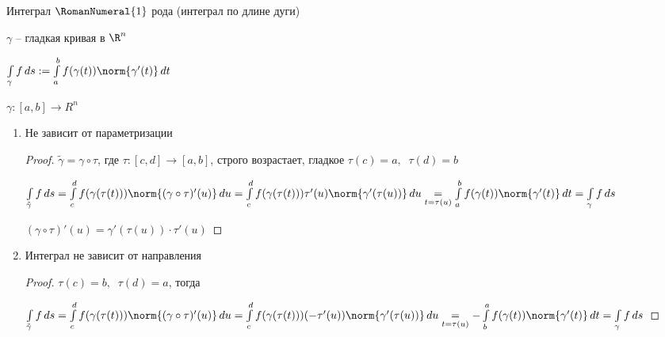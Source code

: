 
\begin{definition}\thmslashn
	
	Интеграл $\RomanNumeral{1}$ рода (интеграл по длине дуги)
	
	$\gamma$ -- гладкая кривая в $\R^n$
	
	$\int\limits_{\gamma} f \,ds := \int\limits_{a}^{b} f(\gamma(t)) \norm{\gamma'(t)} \,dt$
	
	$\gamma: [a, b] \to R^{n}$
	
\end{definition}

\begin{properties}\thmslashn
	
	\begin{enumerate}[1.]
		\item 
		Не зависит от параметризации
		
		\begin{proof}\thmslashn
			
			$\tilde{\gamma} = \gamma \circ \tau$, где $\tau: [c, d] \to [a, b]$, строго возрастает, гладкое $\tau(c) = a, \;\;\tau(d) = b$
			
			$\int\limits_{\tilde{\gamma}} f \,ds = \int\limits_{c}^{d} f(\gamma(\tau(t))) \norm{(\gamma\circ\tau)'(u)} \,du = \int\limits_{c}^{d} f(\gamma(\tau(t))) \tau'(u) \norm{\gamma'(\tau(u))} \,du \underset{t = \tau(u)}= \int\limits_{a}^{b} f(\gamma(t)) \norm{\gamma'(t)} \,dt = \int\limits_{\gamma} f \,ds$
			
			$(\gamma\circ \tau)'(u) = \gamma'(\tau(u))\cdot \tau'(u)$	
			
		\end{proof}
		
		\item
		Интеграл не зависит от направления 
		
		\begin{proof}\thmslashn

			$\tau(c) = b,\;\; \tau(d) = a$, тогда

			
			$\int\limits_{\tilde{\gamma}} f \,ds = \int\limits_{c}^{d} f(\gamma(\tau(t))) \norm{(\gamma\circ\tau)'(u)} \,du = \int\limits_{c}^{d} f(\gamma(\tau(t))) (-\tau'(u)) \norm{\gamma'(\tau(u))} \,du \underset{t = \tau(u)}= -\int\limits_{b}^{a} f(\gamma(t)) \norm{\gamma'(t)} \,dt = \int\limits_{\gamma} f \,ds$
			

		\end{proof}
	

\end{enumerate}
\end{properties}
